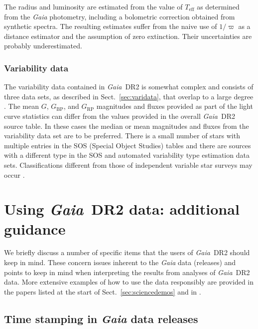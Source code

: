 \documentclass[longauth]{aa_gaia} %
\newcommand\gaia{\textit{Gaia}}
\newcommand\gdr[1]{\gaia~DR#1}
\newcommand\secref[1]{Sect.~\ref{#1}}
\newcommand\gbp{\ensuremath{G_\mathrm{BP}}}
\newcommand\grp{\ensuremath{G_\mathrm{RP}}}
\newcommand\teff{\ensuremath{T_\mathrm{eff}}}
\begin{document}
The radius and luminosity are estimated from the value of {\teff} as determined from the {\gaia}
photometry, including a bolometric correction obtained from synthetic spectra. The resulting
estimates suffer from the naive use of $1/\varpi$ as a distance estimator and the assumption of zero
extinction. Their uncertainties are probably underestimated. 

\subsubsection{Variability data}

The variability data contained in \gdr{2} is somewhat complex and consists of three data sets, as
described in \secref{sec:varidata}, that overlap to a large degree \citep[for details refer
to][]{DR2-DPACP-49}. The mean $G$, {\gbp}, and {\grp} magnitudes and fluxes provided as part of the
light curve statistics can differ from the values provided in the overall \gdr{2} source table. In
these cases the median or mean magnitudes and fluxes from the variability data set are to be
preferred. There is a small number of stars with multiple entries in the SOS (Special Object
Studies) tables and there are sources with a different type in the SOS and automated variability
type estimation data sets.  Classifications different from those of independent variable star
surveys may occur \citep{DR2-DPACP-49, DR2-DPACP-39}.

%
%
\section{Using \gdr{2} data: additional guidance}
\label{sec:guidance}

We briefly discuss a number of specific items that the users of \gdr{2} should keep in mind.
These concern issues inherent to the {\gaia} data (releases) and points to keep in mind when
interpreting the results from analyses of \gdr{2} data. More extensive examples of how to use the
data responsibly are provided in the papers listed at the start of \secref{sec:sciencedemos} and in
\cite{DR2-DPACP-38}.

\subsection{Time stamping in {\gaia} data releases}
\end{document}

